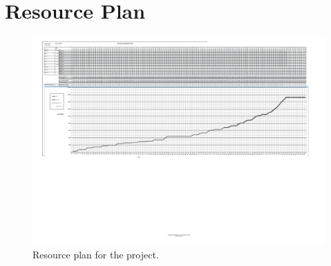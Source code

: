 \documentclass[11pt, titlepage]{article} %
\begin{document}
\section{Resource Plan}
\begin{figure}
     \centering
     \includegraphics[scale=0.8]{resource_plan.pdf}
     \caption{Resource plan for the project.}
     \label{fig:resource}
 \end{figure}
\end{document}
